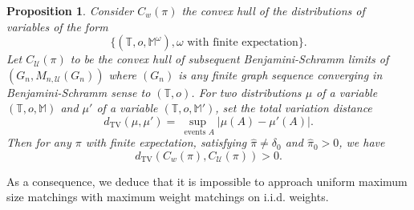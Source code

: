 \documentclass[11pt]{article}
\newtheorem{prop}{Proposition}[section]
\begin{document}
\begin{prop}\label{prop:pasuniforme}
    Consider $C_{w}(\pi)$ the convex hull of the distributions of variables of the form
    \[ \bigg\{ (\mathbb{T},o,\mathbb{M}^{\omega}), \omega \text{ with finite expectation} \bigg\}   .\]
    Let $C_{\mathcal{U}}(\pi)$ to be the convex hull of subsequent Benjamini-Schramm limits of $(G_n,M_{n,\mathcal{U}}(G_n))$ where $(G_n)$ is any finite graph sequence converging in Benjamini-Schramm sense to $(\mathbb{T},o)$.
    For two distributions $\mu$ of a variable $(\mathbb{T},o,\mathbb{M})$ and $\mu'$ of a variable $(\mathbb{T},o,\mathbb{M}')$, set the total variation distance \[d_{\mathrm{TV}}(\mu,\mu')=\sup_{ \text{ events }A} | \mu(A)-\mu'(A)| .\]
    Then for any $\pi$ with finite expectation, satisfying $\hat{\pi} \neq \delta_0$ and $\hat{\pi}_0>0$, we have 
    \[ d_{\mathrm{TV}}(C_w(\pi),C_{\mathcal{U}}(\pi))> 0 . \]
\end{prop}
As a consequence, we deduce that it is impossible to approach uniform maximum size matchings with maximum weight matchings on i.i.d. weights.
\end{document}
